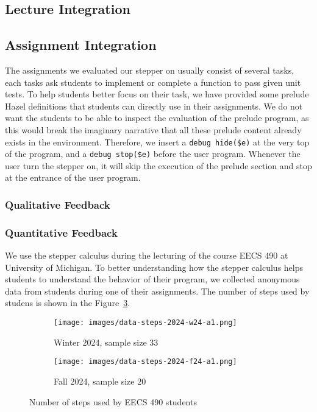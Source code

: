 
\subsection{Lecture Integration}

\subsection{Assignment Integration}

The assignments we evaluated our stepper on usually consist of several
tasks, each tasks ask students to implement or complete a function to
pass given unit tests. To help students better focus on their task, we
have provided some prelude Hazel definitions that students can
directly use in their assignments. We do not want the students to be
able to inspect the evaluation of the prelude program, as this would
break the imaginary narrative that all these prelude content already
exists in the environment. Therefore, we insert a
\lstinline[language=hazel]{debug hide($e)} at the very top of the
program, and a \lstinline[language=hazel]{debug stop($e)} before the
user program. Whenever the user turn the stepper on, it will skip the
execution of the prelude section and stop at the entrance of the user
program.

\subsubsection{Qualitative Feedback}

\subsubsection{Quantitative Feedback}

We use the stepper calculus during the lecturing of the course EECS
490 at University of Michigan. To better understanding how the stepper
calculus helps students to understand the behavior of their program,
we collected anonymous data from students during one of their
assignments. The number of steps used by studens is shown in the
Figure~\ref{fig:eval-num-steps}.

\begin{figure}[ht]
  \centering
  \begin{minipage}{.40\linewidth}
    \begin{subfigure}{\linewidth}
      \texttt{[image: images/data-steps-2024-w24-a1.png]}
      \caption{Winter 2024, sample size 33}
      \label{fig:eval-num-steps-w24}
    \end{subfigure}
  \end{minipage}
  \quad
  \begin{minipage}{.40\linewidth}
    \begin{subfigure}{\linewidth}
      \texttt{[image: images/data-steps-2024-f24-a1.png]}
      \caption{Fall 2024, sample size 20}
      \label{fig:eval-num-steps-f24}
    \end{subfigure}
  \end{minipage}
  \caption{Number of steps used by EECS 490 students}
  \label{fig:eval-num-steps}
\end{figure}

